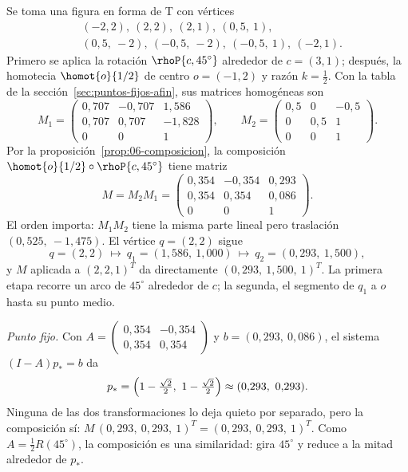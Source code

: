 \begin{ejemplo}\label{ej:06-rot-escala}
Se toma una figura en forma de T con vértices
\[
\begin{aligned}
&(-2,2),\ (2,2),\ (2,1),\ (0{,}5,\ 1),\\
&(0{,}5,\ -2),\ (-0{,}5,\ -2),\ (-0{,}5,\ 1),\ (-2,1).
\end{aligned}
\]
Primero se aplica la rotación \(\rhoP{c,45^\circ}\) alrededor de \(c=(3,1)\); después, la
homotecia \(\homot{o}{1/2}\) de centro \(o=(-1,2)\) y razón \(k=\tfrac12\). Con la tabla de la
sección~\ref{sec:puntos-fijos-afin}, sus matrices homogéneas son
\[
M_1=
\begin{pmatrix}
0{,}707&-0{,}707&1{,}586\\
0{,}707&0{,}707&-1{,}828\\
0&0&1
\end{pmatrix},
\qquad
M_2=
\begin{pmatrix}
0{,}5&0&-0{,}5\\
0&0{,}5&1\\
0&0&1
\end{pmatrix}.
\]
Por la proposición~\ref{prop:06-composicion}, la composición \(\homot{o}{1/2}\circ\rhoP{c,45^\circ}\)
tiene matriz
\[
M=M_2M_1=
\begin{pmatrix}
0{,}354&-0{,}354&0{,}293\\
0{,}354&0{,}354&0{,}086\\
0&0&1
\end{pmatrix}.
\]
El orden importa: \(M_1M_2\) tiene la misma parte lineal pero traslación \((0{,}525,\ -1{,}475)\).
El vértice \(q=(2,2)\) sigue
\[
  q=(2,2)\ \longmapsto\ q_1=(1{,}586,\ 1{,}000)\ \longmapsto\ q_2=(0{,}293,\ 1{,}500),
\]
y \(M\) aplicada a \((2,2,1)^T\) da directamente \((0{,}293,\ 1{,}500,\ 1)^T\). La primera
etapa recorre un arco de \(45^\circ\) alrededor de \(c\); la segunda, el segmento de \(q_1\)
a \(o\) hasta su punto medio.

\emph{Punto fijo.} Con \(A=\begin{pmatrix}0{,}354&-0{,}354\\0{,}354&0{,}354\end{pmatrix}\) y
\(b=(0{,}293,\ 0{,}086)\), el sistema \((I-A)p_\ast=b\) da
\[
  p_\ast=\Bigl(1-\tfrac{\sqrt2}{2},\ 1-\tfrac{\sqrt2}{2}\Bigr)\approx(0{,}293,\ 0{,}293).
\]
Ninguna de las dos transformaciones lo deja quieto por separado, pero la composición sí:
\(M\,(0{,}293,\ 0{,}293,\ 1)^T=(0{,}293,\ 0{,}293,\ 1)^T\). Como \(A=\tfrac12R(45^\circ)\), la
composición es una similaridad: gira \(45^\circ\) y reduce a la mitad alrededor de \(p_\ast\).
\end{ejemplo}

